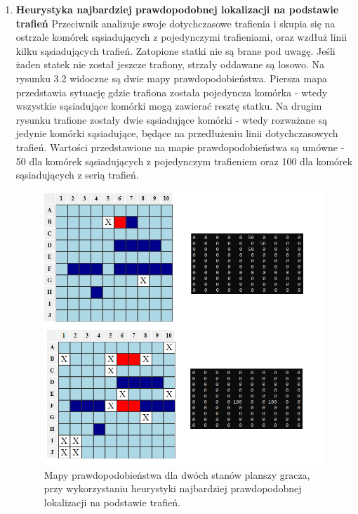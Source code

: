 \begin{enumerate}
  \item \textbf{Heurystyka najbardziej prawdopodobnej lokalizacji na podstawie trafień}
  Przeciwnik analizuje swoje dotychczasowe trafienia i skupia się na ostrzale komórek sąsiadujących z pojedynczymi trafieniami, oraz wzdłuż linii kilku sąsiadujących trafień. Zatopione statki nie są brane pod uwagę. Jeśli żaden statek nie został jeszcze trafiony, strzały oddawane są losowo. Na rysunku 3.2 widoczne są dwie mapy prawdopodobieństwa. Piersza mapa przedstawia sytuację gdzie trafiona została pojedyncza komórka - wtedy wszystkie sąsiadujące komórki mogą zawierać resztę statku. Na drugim rysunku trafione zostały dwie sąsiadujące komórki - wtedy rozważane są jedynie komórki sąsiadujące, będące na przedłużeniu linii dotychczasowych trafień. Wartości przedstawione na mapie prawdopodobieństwa są umówne - 50 dla komórek sąsiadujących z pojedynczym trafieniem oraz 100 dla komórek sąsiadujących z serią trafień.
  \begin{figure}[!h]
    \label{fig:mapa-prawdopodobienstwa-heurystyka-trafien}
    \centering \includegraphics[width=0.9\linewidth]{img/hit-heuristic.png}
    \caption{Mapy prawdopodobieństwa dla dwóch stanów planszy gracza, przy wykorzystaniu heurystyki najbardziej prawdopodobnej lokalizacji na podstawie trafień.}
\end{figure}
  

\end{enumerate}
